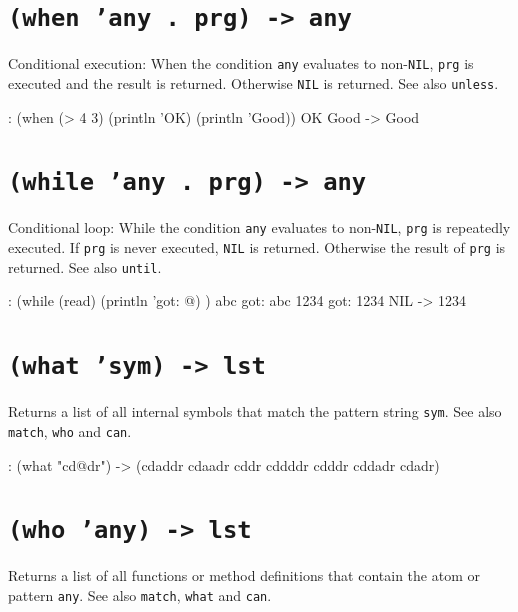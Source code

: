  
\section*{\texttt{(when 'any . prg) -> any}}
\label{sec:func-ref-W-(when 'any . prg) -> any}


Conditional execution: When the condition \texttt{any} evaluates to non-\texttt{NIL},
\texttt{prg} is executed and the result is returned. Otherwise \texttt{NIL} is
returned. See also \texttt{unless}.


\begin{wideverbatim}
: (when (> 4 3) (println 'OK) (println 'Good))
OK
Good
-> Good
\end{wideverbatim}

 
\section*{\texttt{(while 'any . prg) -> any}}
\label{sec:func-ref-W-(while 'any . prg) -> any}


Conditional loop: While the condition \texttt{any} evaluates to non-\texttt{NIL},
\texttt{prg} is repeatedly executed. If \texttt{prg} is never executed, \texttt{NIL} is
returned. Otherwise the result of \texttt{prg} is returned. See also \texttt{until}.


\begin{wideverbatim}
: (while (read)
   (println 'got: @) )
abc
got: abc
1234
got: 1234
NIL
-> 1234
\end{wideverbatim}

 
\section*{\texttt{(what 'sym) -> lst}}
\label{sec:func-ref-W-(what 'sym) -> lst}


Returns a list of all internal symbols that match the pattern string
\texttt{sym}. See also \texttt{match}, \texttt{who} and \texttt{can}.


\begin{wideverbatim}
: (what "cd@dr")
-> (cdaddr cdaadr cddr cddddr cdddr cddadr cdadr)
\end{wideverbatim}

 
\section*{\texttt{(who 'any) -> lst}}
\label{sec:func-ref-W-(who 'any) -> lst}


Returns a list of all functions or method definitions that contain the
atom or pattern \texttt{any}. See also \texttt{match}, \texttt{what} and \texttt{can}.


